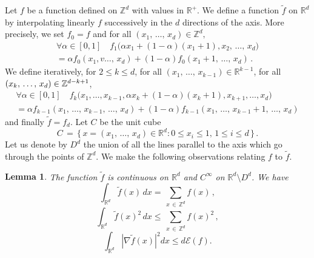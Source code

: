 \documentclass[10pt]{amsart}
\newtheorem{lemm}[theo]{Lemma}\newtheorem{prop}[theo]{Proposition}\newtheorem{coro}[theo]{Corollary}\newtheorem{conj}[theo]{Conjecture}
\theoremstyle{definition}\newtheorem{defi}[theo]{Definition}\newtheorem{rema}[theo]{Remark}\newtheorem{exam}[theo]{Example}\newtheorem{exem}[theo]{Example}\newtheorem{nota}[theo]{Notation}
\newcommand*\Z {{\mathbb Z}}
\newcommand*\Zd {{\mathbb Z^d}}
\newcommand*\Rd {{\mathbb R^d}}
\newcommand*\R{\mathbb{R}}
\newcommand*\ft{\widetilde f}
\newcommand{\cE}{\mathcal{E}}
\let\oldforall\forall
\renewcommand*{\forall}{\mathrel{\oldforall}}
\begin{document}
Let $f$ be a function defined on $\Z^d$ with values in $\R^+$. We define a function $\ft$ on $\R^d$ by interpolating linearly $f$ successively in the $d$ directions of the axis. More precisely, we set $f_0=f$ and for all $(x_1,\,\dots,\,x_d)\in\Zd, $
\begin{multline*}
\forall \alpha\in [0,1]\quad f_1\big(\alpha x_1+(1-\alpha)(x_1+1),x_2,\,\dots,\,x_d\big)\\
=\alpha f_0(x_1,v\dots,\,x_d)+ (1-\alpha) f_0(x_1+1,\,\dots,\,x_d)\,.
\end{multline*}
We define iteratively, for $2\leq k\leq d$, for all $(x_1,\,\dots,\,x_{k-1})\in\R^{k-1}$, for all $(x_k,\,\dots,\,x_d)\linebreak\in\Z^{d-k+1}$,
\begin{multline*}
\forall \alpha\in [0,1]\quad f_k\big(x_1,\dots,x_{k-1},\alpha x_k+(1-\alpha)(x_k+1),x_{k+1},
\dots,x_d\big)\\
=\alpha f_{k-1}(x_1,\,\dots,\,x_{k-1},\,\dots,\,x_d)+ (1-\alpha) f_{k-1}(x_1,\,\dots,\,x_{k-1}+1,\,\dots,\,x_d)
\end{multline*}
and finally $\ft=f_d$. Let $C$ be the unit cube
\[
C\,=\,\big\{\,
x=(x_1,\,\dots,\,x_d)\in\Rd:0\leq x_i\leq 1,\,1\leq i\leq d\,\big\}\,.
\]
Let us denote by $D^d$ the union of all the lines parallel to the axis which go through the points of $\Zd$. We make the following observations relating $f$ to $\widetilde f$.
\begin{lemm}\label{L:ftildef}
The function $\ft$ is continuous on $\Rd$ and $C^\infty$ on $\Rd\setminus D^d$. We have
\begin{equation}\label{ftildef1}
\int_{\R^d} \widetilde f(x)\, dx = \,\sum_{x\,\in\,\Zd} f(x)\,,
\end{equation}
\begin{equation}\label{ftildef3}
\int_{\R^d} \widetilde f(x)^2\, dx \leq \,\sum_{x\,\in\,\Zd} f(x)^2\,,
\end{equation}
\begin{equation}\label{ftildef2}
\int_{\R^d} \left|\nabla \widetilde f(x)\right|^2 dx \le d \cE(f).
\end{equation}
\end{lemm}
\end{document}
